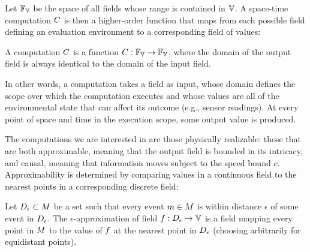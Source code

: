 \documentclass[12pt,a4paper,twoside,openright]{book}
\begin{document}
Let $\fieldsof{\spaceof{\datavalue}}$ be the space of all fields whose range is contained in ${\spaceof{\datavalue}}$.
%
A space-time computation $C$ is then a higher-order function that maps from each possible field defining an evaluation environment to a corresponding field of values:
\begin{thrdefn}
  A computation $C$ is a function $\computation: \fieldsof{\spaceof{\datavalue}} \rightarrow \fieldsof{\spaceof{\datavalue}}$, where the domain of the output field is always identical to the domain of the input field.
\end{thrdefn}
\noindent
In other words, a computation takes a field as input, whose domain defines the scope over which the computation executes and whose values are all of the environmental state that can affect its outcome (e.g., sensor readings).  At every point of space and time in the execution scope, some output value is produced.

The computations we are interested in are those physically realizable: those that are both approximable, meaning that the output field is bounded in its intricacy, and causal, meaning that information moves subject to the speed bound $c$.
%
Approximability is determined by comparing values in a continuous field to the nearest points in a corresponding discrete field:

\begin{thrdefn}\label{def:eapprox}
  Let $D_{\epsilon} \subset M$ be a set such that every event $m \in M$ is within distance $\epsilon$ of some event in $D_{\epsilon}$.
  The $\epsilon$-approximation of field $\field: \discreteset_{\epsilon} \rightarrow \spaceof{\datavalue}$ is a field mapping every point in $M$ to the value of $f$ at the nearest point in $D_{\epsilon}$ (choosing arbitrarily for equidistant points).
\end{thrdefn}
\end{document}
